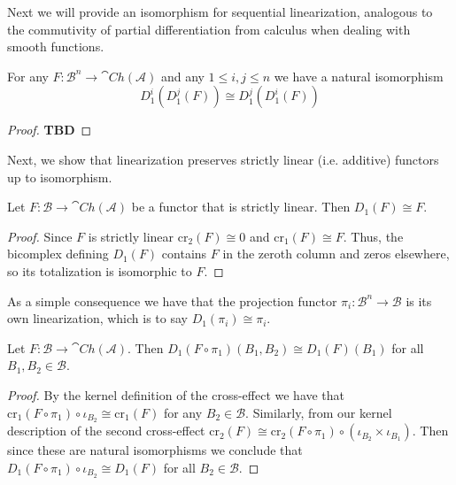 Next we will provide an isomorphism for sequential linearization, analogous to the commutivity of partial differentiation from calculus when dealing with smooth functions.

\begin{lem}[label=lem:5.15]
    For any $F:\mathcal{B}^n\to \cat{Ch}(\mathcal{A})$ and any $1 \leq i,j\leq n$ we have a natural isomorphism
    \begin{equation*}
        D_1^i(D_1^j(F)) \cong D_1^j(D_1^i(F))
    \end{equation*}
\end{lem}
\begin{proof}
    \textbf{TBD} 
\end{proof}

Next, we show that linearization preserves strictly linear (i.e. additive) functors up to isomorphism.

\begin{prop}[label=prop:strictLin]
    Let $F:\mathcal{B}\to \cat{Ch}(\mathcal{A})$ be a functor that is strictly linear. Then $D_1(F)\cong F$.
\end{prop}
\begin{proof}
    Since $F$ is strictly linear $\text{cr}_2(F) \cong 0$ and $\text{cr}_1(F) \cong F$. Thus, the bicomplex defining $D_1(F)$ contains $F$ in the zeroth column and zeros elsewhere, so its totalization is isomorphic to $F$.
\end{proof}

As a simple consequence we have that the projection functor $\pi_i:\mathcal{B}^n\to \mathcal{B}$ is its own linearization, which is to say $D_1(\pi_i)\cong \pi_i$.


\begin{cor}[label=cor:constLinearization]
    Let $F:\mathcal{B}\to \cat{Ch}(\mathcal{A})$. Then $D_1(F\circ \pi_1)(B_1,B_2)\cong D_1(F)(B_1)$ for all $B_1,B_2 \in \mathcal{B}$.
\end{cor}
\begin{proof}
    By the kernel definition of the cross-effect we have that $\text{cr}_1(F\circ \pi_1)\circ \iota_{B_2}\cong \text{cr}_1(F)$ for any $B_2 \in \mathcal{B}$. Similarly, from our kernel description of the second cross-effect $\text{cr}_2(F)\cong \text{cr}_2(F\circ \pi_1)\circ (\iota_{B_2}\times \iota_{B_1})$. Then since these are natural isomorphisms we conclude that $D_1(F\circ \pi_1)\circ \iota_{B_2}\cong D_1(F)$ for all $B_2 \in \mathcal{B}$.
\end{proof}

